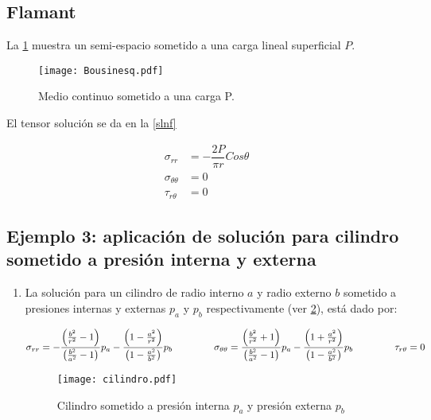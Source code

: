 \documentclass[../notas medios.tex]{subfiles}
\begin{document}
\subsection{Flamant}
La \cref{Flamant} muestra un semi-espacio sometido a una carga lineal superficial \(P\). 

\begin{figure}[H]
\centering
	\texttt{[image: Bousinesq.pdf]}
	\caption{Medio continuo sometido a una carga P.}
	\label{Flamant}
\end{figure}

El tensor solución se da en la \cref{slnf}

\begin{equation}
\begin{split}
{ \sigma_{rr}} & = -\dfrac{2P}{\pi r} Cos \theta \\
{\sigma_{\theta\theta}}  &= 0\\
{\tau_{r\theta}}&= 0
\end{split}
\label{slnf}
\end{equation}

\subsection*{Ejemplo 3: aplicación de solución para cilindro sometido a presión interna y externa}

\begin{enumerate} 

\item La solución para un cilindro de radio interno $a$ y radio externo $b$ sometido a presiones internas y externas $p_a$ y $p_b$ respectivamente (ver \cref{cilindro}), está dado por:

\begin{equation*}
\sigma _{rr}  =  - \frac{{\left( {\frac{{{b^2}}}{{{r^2}}} - 1} \right)}}{{\left( {\frac{{{b^2}}}{{{a^2}}} - 1} \right)}}{p_a} - \frac{{\left( {1 - \frac{{{a^2}}}{{{r^2}}}} \right)}}{{\left( {1 - \frac{{{a^2}}}{{{b^2}}}} \right)}}{p_b} \hspace{1.5cm}
\sigma _{\theta \theta } = \frac{{\left( {\frac{{{b^2}}}{{{r^2}}} + 1} \right)}}{{\left( {\frac{{{b^2}}}{{{a^2}}} - 1} \right)}}{p_a} - \frac{{\left( {1 + \frac{{{a^2}}}{{{r^2}}}} \right)}}{{\left( {1 - \frac{{{a^2}}}{{{b^2}}}} \right)}}{p_b} \hspace{1.5cm}
\tau _{r\theta} = 0
\label{slnc}
\end{equation*}

\begin{figure}[H]
\centering
	\texttt{[image: cilindro.pdf]}
	\caption{Cilindro sometido a presión interna $p_a$ y presión externa $p_b$}
	\label{cilindro}
\end{figure}

\end{enumerate}
\end{document}
